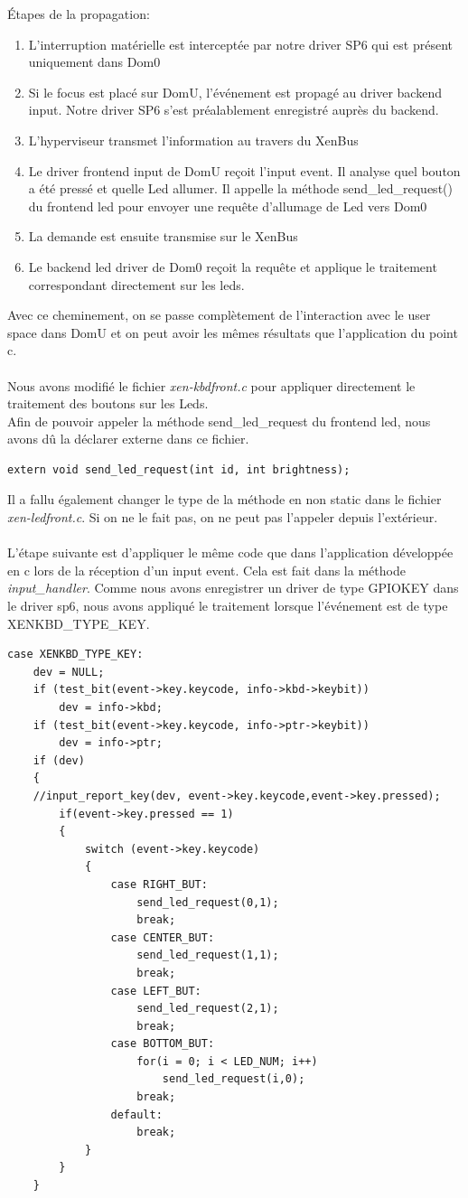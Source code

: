 Étapes de la propagation:
\begin{enumerate}
	\item L'interruption matérielle est interceptée par notre driver SP6 qui est présent uniquement dans Dom0
	\item Si le focus est placé sur DomU, l'événement est propagé au driver backend input. Notre driver SP6 s'est préalablement enregistré auprès du backend.
	\item L'hyperviseur transmet l'information au travers du XenBus
	\item Le driver frontend input de DomU reçoit l'input event. Il analyse quel bouton a été pressé et quelle Led allumer. Il appelle la méthode send\_led\_request() du frontend led pour envoyer une requête d'allumage de Led vers Dom0
	\item La demande est ensuite transmise sur le XenBus
	\item Le backend led driver de Dom0 reçoit la requête et applique le traitement correspondant directement sur les leds.
\end{enumerate}
Avec ce cheminement, on se passe complètement de l'interaction avec le user space dans DomU et on peut avoir les mêmes résultats que l'application du point c.\\\\
Nous avons modifié le fichier \textit{xen-kbdfront.c} pour appliquer directement le traitement des boutons sur les Leds.\\
Afin de pouvoir appeler la méthode send\_led\_request du frontend led, nous avons dû la déclarer externe dans ce fichier.
\begin{lstlisting}
extern void send_led_request(int id, int brightness);
\end{lstlisting}
Il a fallu également changer le type de la méthode en non static dans le fichier \textit{xen-ledfront.c}. Si on ne le fait pas, on ne peut pas l'appeler depuis l'extérieur.\\\\
L'étape suivante est d'appliquer le même code que dans l'application développée en c lors de la réception d'un input event. Cela est fait dans la méthode \textit{input\_handler}. Comme nous avons enregistrer un driver de type GPIOKEY dans le driver sp6, nous avons appliqué le traitement lorsque l'événement est de type XENKBD\_TYPE\_KEY.
\begin{lstlisting}
case XENKBD_TYPE_KEY:
	dev = NULL;
	if (test_bit(event->key.keycode, info->kbd->keybit))
		dev = info->kbd;
	if (test_bit(event->key.keycode, info->ptr->keybit))
		dev = info->ptr;
	if (dev)
	{
	//input_report_key(dev, event->key.keycode,event->key.pressed);
		if(event->key.pressed == 1)
		{
			switch (event->key.keycode) 
			{
				case RIGHT_BUT:
					send_led_request(0,1);
					break;
				case CENTER_BUT:
					send_led_request(1,1);
					break;
				case LEFT_BUT:
					send_led_request(2,1);
					break;
				case BOTTOM_BUT:
					for(i = 0; i < LED_NUM; i++)
						send_led_request(i,0);
					break;
				default:
					break;
			}
		}
	}
\end{lstlisting}
